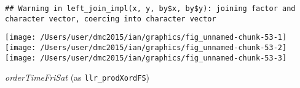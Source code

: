\documentclass[10pt]{report}
\newenvironment{Shaded}{}{}
\newcommand{\KeywordTok}[1]{\textcolor[rgb]{0.00,0.44,0.13}{\textbf{{#1}}}}
\newcommand{\DataTypeTok}[1]{\textcolor[rgb]{0.56,0.13,0.00}{{#1}}}
\newcommand{\StringTok}[1]{\textcolor[rgb]{0.25,0.44,0.63}{{#1}}}
\newcommand{\NormalTok}[1]{{#1}}
\begin{document}
\begin{Shaded}
\end{Shaded}

\begin{verbatim}
## Warning in left_join_impl(x, y, by$x, by$y): joining factor and character vector, coercing into character vector
\end{verbatim}

\begin{Shaded}
\end{Shaded}

\begin{center}\texttt{[image: /Users/user/dmc2015/ian/graphics/fig\_unnamed-chunk-53-1]} \texttt{[image: /Users/user/dmc2015/ian/graphics/fig\_unnamed-chunk-53-2]} \texttt{[image: /Users/user/dmc2015/ian/graphics/fig\_unnamed-chunk-53-3]} \end{center}

\emph{orderTimeFriSat} (as \texttt{llr\_prodXordFS})
\end{document}
